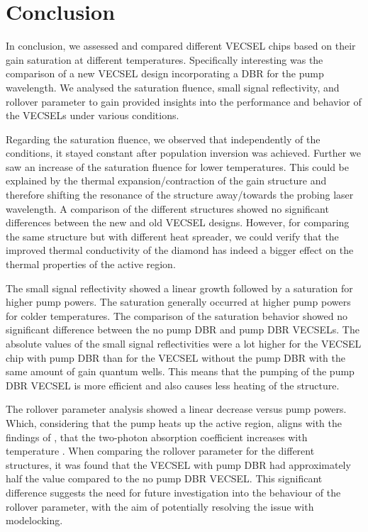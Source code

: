 \chapter{Conclusion}\label{chapter:Conclusion}

In conclusion, we assessed and compared different VECSEL chips based on their gain saturation at different temperatures. Specifically interesting was the comparison of a new VECSEL design incorporating a DBR for the pump wavelength. We analysed the saturation fluence, small signal reflectivity, and rollover parameter to gain provided insights into the performance and behavior of the VECSELs under various conditions.

Regarding the saturation fluence, we observed that independently of the conditions, it  stayed constant after population inversion was achieved. Further we saw an increase of the saturation fluence for lower temperatures. This could be explained by the thermal expansion/contraction of the gain structure and therefore shifting the resonance of the structure away/towards the probing laser wavelength. A comparison of the different structures showed no significant differences between the new and old VECSEL designs. However, for comparing the same structure but with different heat spreader, we could verify that the improved thermal conductivity of the diamond has indeed a bigger effect on the thermal properties of the active region.

The small signal reflectivity showed a linear growth followed by a saturation for higher pump powers. The saturation generally occurred at higher pump powers for colder temperatures. The comparison of the saturation behavior showed no significant difference between the no pump DBR and pump DBR VECSELs. The absolute values of the small signal reflectivities were a lot higher for the VECSEL chip with pump DBR than for the VECSEL without the pump DBR with the same amount of gain quantum wells. This means that the pumping of the pump DBR VECSEL is more efficient and also causes less heating of the structure.

The rollover parameter analysis showed a linear decrease versus pump powers. Which, considering that the pump heats up the active region, aligns with the findings of , that the two-photon absorption coefficient increases with temperature \cite{GaAsTemp}. When comparing the rollover parameter for the different structures, it was found that the VECSEL with pump DBR had approximately half the value compared to the no pump DBR VECSEL. This significant difference suggests the need for future investigation into the behaviour of the rollover parameter, with the aim of potentially resolving the issue with modelocking.


